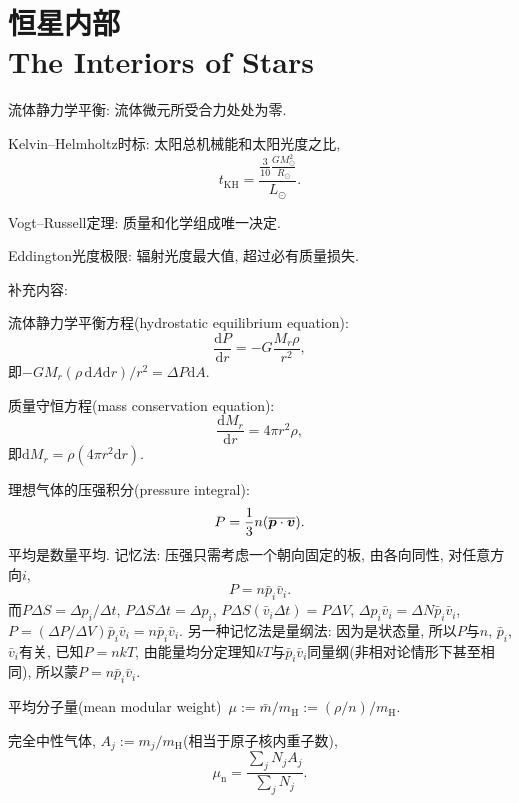 \chapter{恒星内部\\The Interiors of Stars}

流体静力学平衡: 流体微元所受合力处处为零.

Kelvin--Helmholtz时标: 太阳总机械能和太阳光度之比,
\begin{equation*}
    t_\text{KH}=\frac{\frac{3}{10}\frac{GM_\odot^2}{R_\odot}}{L_\odot}.
\end{equation*}

Vogt--Russell定理: 质量和化学组成唯一决定.

Eddington光度极限: 辐射光度最大值, 超过必有质量损失.

补充内容:

流体静力学平衡方程(hydrostatic equilibrium equation):
\begin{equation*}
    \frac{\mathrm{d} P}{\mathrm{d} r}
    = -G\frac{M_r\rho}{r^2},
\end{equation*}
即$-GM_r(\rho\,\mathrm{d}A\mathrm{d}r)/r^2=\Delta P\mathrm{d}A$.

质量守恒方程(mass conservation equation):
\begin{equation*}
    \frac{\mathrm{d} M_r}{\mathrm{d} r}
    = 4\pi r^2\rho,
\end{equation*}
即$\mathrm{d} M_r=\rho (4\pi r^2\mathrm{d} r)$.

理想气体的压强积分(pressure integral):
\begin{equation*}
    P=\frac{1}{3}n(\overline{\boldsymbol{p}\cdot\boldsymbol{v}}).
\end{equation*}
平均是数量平均. 记忆法: 压强只需考虑一个朝向固定的板, 由各向同性, 对任意方向$i$,
\begin{equation*}
    P=n\bar{p}_i\bar{v}_i.
\end{equation*}
而$P\Delta S = \Delta p_i/\Delta t$, $P\Delta S \Delta t= \Delta p_i$, $P\Delta S (\bar{v}_i\Delta t)= P\Delta V$, $\Delta p_i \bar{v}_i = \Delta N \bar{p}_i\bar{v}_i$, $P=(\Delta P/\Delta V)\bar{p}_i\bar{v}_i=n\bar{p}_i\bar{v}_i$. 另一种记忆法是量纲法: 因为是状态量, 所以$P$与$n$, $\bar{p}_i$, $\bar{v}_i$有关, 已知$P=nkT$, 由能量均分定理知$kT$与$\bar{p}_i\bar{v}_i$同量纲(非相对论情形下甚至相同), 所以蒙$P=n\bar{p}_i\bar{v}_i$.

平均分子量(mean modular weight)~$\mu:=\bar{m}/m_\text{H}:=(\rho/n)/m_\text{H}$.

完全中性气体, $A_j:=m_j/m_\text{H}$(相当于原子核内重子数),
\begin{equation*}
    \mu_\text{n}=\frac{\sum_j N_j A_j}{\sum_j N_j}.
\end{equation*}

